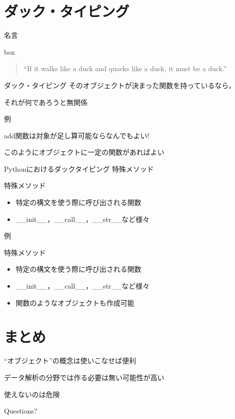 \documentclass[12pt, xetex, xcolor=pdftex, dvipsnames]{beamer}
\begin{document}
\section{ダック・タイピング}
{
    \begin{frame}{名言}
        \begin{beamercolorbox}[rounded=true]{box}
            \begin{quote}
                ``If it walks like a duck and quacks like a duck, it must be a duck.''
            \end{quote}
            \null
        \end{beamercolorbox}
    \end{frame}
}
\begin{frame}{ダック・タイピング}
    そのオブジェクトが決まった関数を持っているなら，

    それが何であろうと無関係
\end{frame}
\begin{frame}[fragile]{例}
    

    add関数は対象が足し算可能ならなんでもよい!

    \pause
    このようにオブジェクトに一定の関数があればよい
\end{frame}
\begin{frame}{Pythonにおけるダックタイピング}
    特殊メソッド
\end{frame}
\begin{frame}{特殊メソッド}
    \begin{itemize}
        \item 特定の構文を使う際に呼び出される関数
        \item \_\_init\_\_，\_\_call\_\_，\_\_str\_\_など様々
    \end{itemize}
\end{frame}
\begin{frame}[fragile]{例}
    
\end{frame}
\begin{frame}{特殊メソッド}
    \begin{itemize}
        \item 特定の構文を使う際に呼び出される関数
        \item \_\_init\_\_，\_\_call\_\_，\_\_str\_\_など様々
        \item 関数のようなオブジェクトも作成可能
    \end{itemize}
\end{frame}

\section{まとめ}
\begin{frame}
    ``オブジェクト''の概念は使いこなせば便利

    データ解析の分野では作る必要は無い可能性が高い

    使えないのは危険
\end{frame}
\begin{frame}[standout]
  Questions?
\end{frame}
\end{document}
